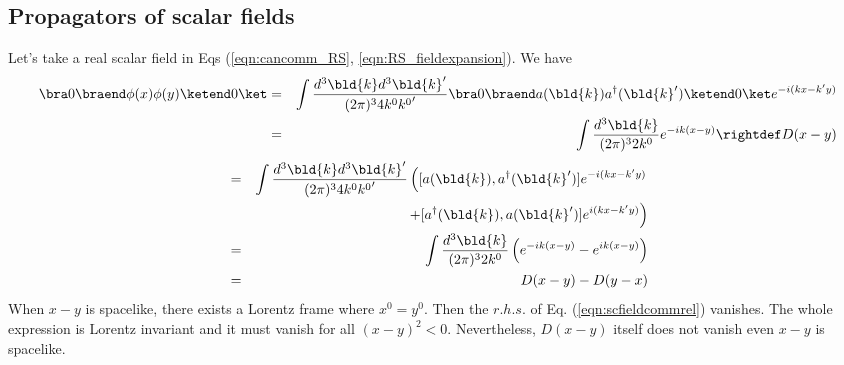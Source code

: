 \begin{comment}%
Provided with ${\cal H}_{int}$ in terms of quantized fields in the interaction picture, 
we write 
\begin{eqnarray}
\bra f \braend S -1 \ketend i \ket
&=&
 -i \int d^4 x' \, \bra f \braend {\cal H}_{int}(x') \ketend i \ket
\nonumber\\
&&+
\frac{(-i)^2}{2}
\int d^4 x_1' d^4 x_2'
\;\bra f \braend T[ {\cal H}_{int}(x_1') {\cal H}_{int}(x_2')] \ketend i \ket
+ \cdots
\nonumber\\
\label{eqn:SmatrixPertSerCov}
\end{eqnarray}
To proceed beyond the second term requires some further preparations
that we describe in the following.
\end{comment}
\subsection{Propagators of scalar fields}
Let's take a real scalar field in Eqs (\ref{eqn:cancomm_RS}, \ref{eqn:RS_fieldexpansion}).
We have
\begin{eqnarray}
\bra 0 \braend \phi(x) \phi(y) \ketend 0 \ket
&=&
\int \frac{d^3 \bld{k} d^3 \bld{k}'}{(2\pi)^3 4 k^0 {k^0}'} 
\bra 0 \braend a(\bld{k}) a^\dagger(\bld{k}') \ketend 0 \ket
e^{-i(kx - k'y)}
\nonumber\\
&=&
\int \frac{d^3 \bld{k} }{(2\pi)^3 2 k^0} 
e^{-ik(x - y)}
\rightdef
D(x-y)
\end{eqnarray}
\begin{eqnarray}
[\phi(x), \phi(y)]
&=&
\int \frac{d^3 \bld{k} d^3 \bld{k}'}{(2\pi)^3 4 k^0 {k^0}'} 
\left(
[a(\bld{k}), a^\dagger(\bld{k}')]e^{-i(kx - k'y)}
\right.
\nonumber\\
&&
\left.
\hspace{35mm}
+
[a^\dagger(\bld{k}), a(\bld{k}')]e^{i(kx - k'y)}
\right)
\nonumber\\
&=&
\int \frac{d^3 \bld{k} }{(2\pi)^3 2 k^0} 
\left(
e^{-ik(x - y)} - e^{ik(x - y)}
\right)
\nonumber\\
&=&
D(x-y) - D(y-x)
\label{eqn:scfieldcommrel}
\end{eqnarray}
When $x-y$ is spacelike, there exists a Lorentz frame where $x^0 = y^0$.
Then the $r.h.s.$ of Eq. (\ref{eqn:scfieldcommrel}) vanishes. 
The whole expression is Lorentz invariant and it must vanish for all $(x-y)^2 < 0$.
Nevertheless, $D(x-y)$ itself does not vanish even $x-y$ is spacelike.

